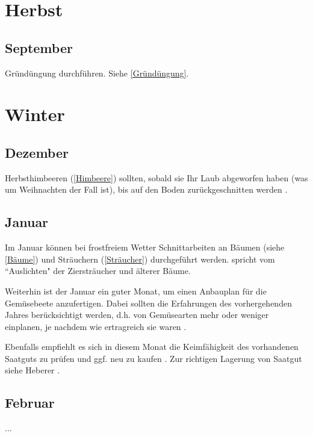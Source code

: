 \section{Herbst}

\subsection{September}

Gründüngung durchführen. Siehe \ref{Gründüngung}.
\vfill
\pagebreak

\section{Winter}

\subsection{Dezember}

Herbsthimbeeren (\ref{Himbeere}) sollten, sobald sie Ihr Laub abgeworfen haben (was um Weihnachten der Fall ist), bis auf den Boden zurückgeschnitten werden \citep[S.~421]{Don2021} \cite{Don2021}.

\subsection{Januar}

Im Januar können bei frostfreiem Wetter Schnittarbeiten an \textrightarrow Bäumen (siehe \ref{Bäume}) und \textrightarrow Sträuchern (\ref{Sträucher}) durchgeführt werden.
\citet[S.~256]{Stangl1995} \cite{Stangl1995} spricht vom ``Auslichten" der Ziersträucher und älterer Bäume.

Weiterhin ist der Januar ein guter Monat, um einen Anbauplan für die Gemüsebeete anzufertigen.
Dabei sollten die Erfahrungen des vorhergehenden Jahres berücksichtigt werden, d.h. von Gemüsearten mehr oder weniger einplanen, je nachdem wie ertragreich sie waren \citep[S.~256]{Stangl1995}.

Ebenfalls empfiehlt es sich in diesem Monat die Keimfähigkeit des vorhandenen Saatguts zu prüfen und ggf. neu zu kaufen \citep[S.~216]{Heberer2018}.
Zur richtigen Lagerung von Saatgut siehe Heberer \citep[S.~179]{Heberer2018}.

\subsection{Februar}

...
